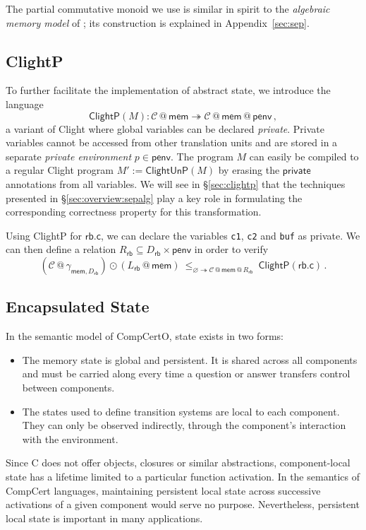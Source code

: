 \documentclass[acmsmall,screen,review,anonymous]{acmart}
\newcommand{\kw}[1]{\ensuremath{ \mathsf{#1} }}
\begin{document}
The partial commutative monoid we use
is similar in spirit to the \emph{algebraic memory model}
of \citet{ccal};
its construction is explained in Appendix~\ref{sec:sep}.


\subsection{ClightP} \label{sec:overview:clightp} %

To further facilitate the implementation of abstract state,
we introduce the language
\[
  \kw{ClightP}(M) :
    \mathcal{C} \mathbin@ \kw{mem}
    \twoheadrightarrow
    \mathcal{C} \mathbin@ \kw{mem} \mathbin@ \kw{penv}
  \,,
\]
a variant of Clight
where global variables can be declared \emph{private}.
Private variables cannot be accessed
from other translation units and are stored
in a separate
\emph{private environment} $p \in \kw{penv}$.
The program $M$ can easily be compiled to a regular
Clight program $M' := \kw{ClightUnP}(M)$
by erasing the $\kw{private}$ annotations from all variables.
We will see in \S\ref{sec:clightp}
that the techniques presented in \S\ref{sec:overview:sepalg} 
play a key role in formulating the corresponding correctness property
for this transformation.

\begin{example}[Verifying $\kw{rb.c}$]
Using ClightP for $\kw{rb.c}$,
we can declare the variables
\texttt{c1}, \texttt{c2} and \texttt{buf}
as private.
We can then
define a relation $R_\kw{rb} \subseteq D_\kw{rb} \times \kw{penv}$
in order to verify
\[
  (\mathcal{C} \mathbin@ \gamma_{\kw{mem},D_\kw{rb}}) \odot
  (L_\kw{rb} \mathbin@ \kw{mem})
  \:
  \le_{\varnothing \twoheadrightarrow \mathcal{C} \mathbin@ \kw{mem} \mathbin@ R_\kw{rb}}
  \:
  \kw{ClightP}(\kw{rb.c})
  \,.
\]
\end{example}


\subsection{Encapsulated State} \label{sec:overview:encap} %

In the semantic model of CompCertO, state exists in two forms:
\begin{itemize}
  \item The memory state is global and persistent.
    It is shared across all components
    and must be carried along
    every time a question or answer transfers control
    between components.
  \item The states used to define transition systems
    are local to each component.
    They can only be observed indirectly,
    through the component's interaction with the environment.
\end{itemize}
Since C does not offer objects, closures or similar abstractions,
component-local state has a lifetime limited to a particular function activation.
In the semantics of CompCert languages,
maintaining persistent local state
across successive activations of a given component
would serve no purpose.
Nevertheless,
persistent local state is important in many applications.
\end{document}
